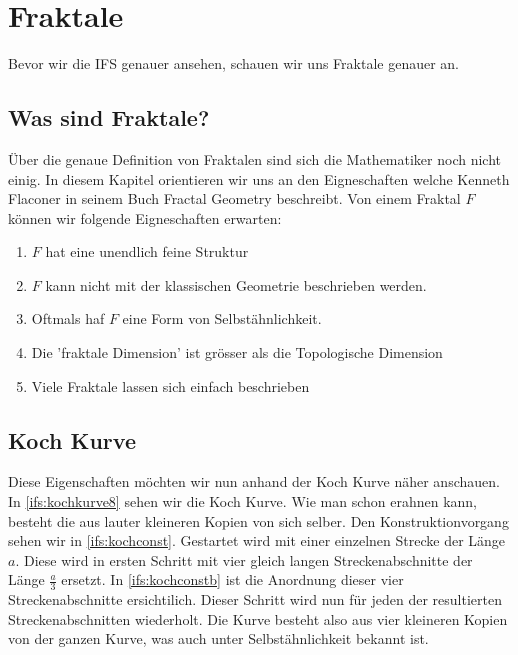 %
%
%
\section{Fraktale
\label{ifs:section:teil1}}
Bevor wir die IFS genauer ansehen, schauen wir uns Fraktale genauer an.

\subsection{Was sind Fraktale?
\label{ifs:subsection:finibus}}
Über die genaue Definition von Fraktalen sind sich die Mathematiker noch nicht einig. 
In diesem Kapitel orientieren wir uns an den Eigneschaften welche Kenneth Flaconer in seinem Buch Fractal Geometry beschreibt.
Von einem Fraktal $F$ können wir folgende Eigneschaften erwarten:
\begin{enumerate}
	\item $F$ hat eine unendlich feine Struktur
	\item $F$ kann nicht mit der klassischen Geometrie beschrieben werden.
	\item Oftmals haf $F$ eine Form von Selbstähnlichkeit.
	\item Die 'fraktale Dimension' ist grösser als die Topologische Dimension
	\item Viele Fraktale lassen sich einfach beschrieben
\end{enumerate}
\subsection{Koch Kurve
	\label{ifs:subsection:lilkoch}}
Diese Eigenschaften möchten wir nun anhand der Koch Kurve näher anschauen.
In \ref{ifs:kochkurve8} sehen wir die Koch Kurve. Wie man schon erahnen kann, besteht die aus lauter kleineren Kopien von sich selber. 
Den Konstruktionvorgang sehen wir in \ref{ifs:kochconst}.
Gestartet wird mit einer einzelnen Strecke der Länge $a$.
Diese wird in ersten Schritt mit vier gleich langen Streckenabschnitte der Länge $\frac{a}{3}$ ersetzt.
In \ref{ifs:kochconstb} ist die Anordnung dieser vier Streckenabschnitte ersichtilich. 
Dieser Schritt wird nun für jeden der resultierten Streckenabschnitten wiederholt.
Die Kurve besteht also aus vier kleineren Kopien von der ganzen Kurve, was auch unter Selbstähnlichkeit bekannt ist.


